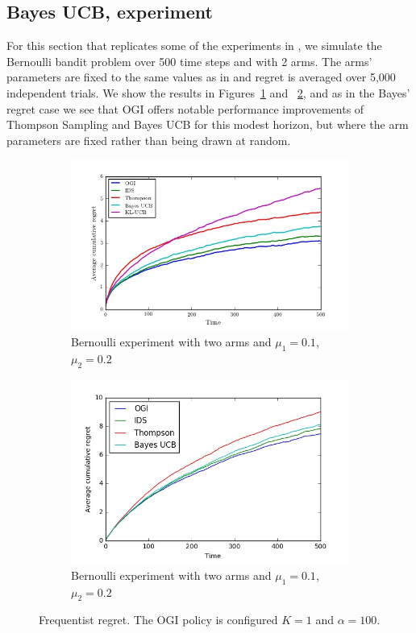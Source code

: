 \subsection{Bayes UCB, \cite{kaufmann2012thompson} experiment} \label{exp:robustness}
For this section that replicates some of the experiments in \cite{kaufmann2012thompson}, we simulate the Bernoulli bandit problem over 500 time steps and with 2 arms. The arms' parameters are fixed to the same values as in \cite{kaufmann2012thompson} and regret is averaged over 5,000 independent trials. We show the results in Figures~\ref{fig:sub3} and ~\ref{fig:sub4}, and as in the Bayes' regret case we see that OGI offers notable performance improvements of Thompson Sampling and Bayes UCB for this modest horizon, but where the arm parameters are fixed rather than being drawn at random.
\begin{figure}[h!]
	\begin{subfigure}{.5\textwidth}
		\centering
		\includegraphics[width=\linewidth]{plots/kaufmann_fig1.jpeg}
		\caption{Bernoulli experiment with two arms and $\mu_1 = 0.1$, $\mu_2 = 0.2$}
		\label{fig:sub3}
	\end{subfigure}
	\begin{subfigure}{.5\textwidth}
		\centering
		\includegraphics[width=\linewidth]{plots/kaufmann_fig1b.jpeg}
		\caption{Bernoulli experiment with two arms and $\mu_1 = 0.1$, $\mu_2 = 0.2$}
		\label{fig:sub4}
	\end{subfigure}%
	\caption{Frequentist regret. The OGI policy is configured $K=1$ and $\alpha=100$.}
	\label{fig:kaufmann_regret}
\end{figure}


